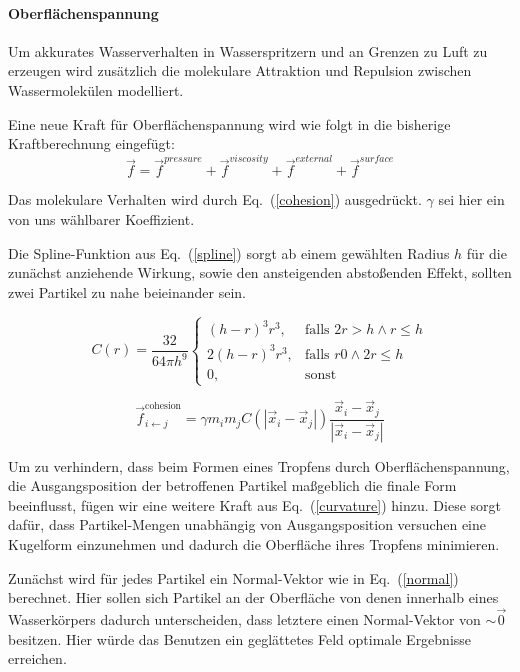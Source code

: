\documentclass[a4paper]{paper}
\renewcommand{\eqref}[1]{Eq.~(\ref{#1})}
\begin{document}
\paragraph{Oberflächenspannung}
Um akkurates Wasserverhalten in Wasserspritzern und an Grenzen zu Luft zu erzeugen wird zusätzlich die molekulare Attraktion und Repulsion zwischen Wassermolekülen modelliert.

Eine neue Kraft für Oberflächenspannung wird wie folgt in die bisherige Kraftberechnung eingefügt:
\begin{equation}
\label{force_with_surface}
\vec{f} = \vec{f}^{pressure} + \vec{f}^{viscosity} + \vec{f}^{external} + \vec{f}^{surface}
\end{equation}


Das molekulare Verhalten wird durch \eqref{cohesion} ausgedrückt. $\gamma$ sei hier ein von uns wählbarer Koeffizient.

Die Spline-Funktion aus \eqref{spline} sorgt ab einem gewählten Radius $h$ für die zunächst anziehende Wirkung, sowie den ansteigenden abstoßenden Effekt, sollten zwei Partikel zu nahe beieinander sein.

\begin{equation}
\label{spline}
C(r) = \frac{32}{64 \pi h^9}
\begin{cases}
(h-r)^3r^3,  &\text{falls }  2r > h \land r \leq h\\
2(h-r)^3r^3, &\text{falls } r  0 \land 2r \leq h\\
0,&\text{sonst}  
\end{cases}
\end{equation}



\begin{equation}
\label{cohesion}
\vec{f}_{i\leftarrow j}^{\text{cohesion}} = \gamma m_{i} m_{j} C(|\vec{x}_i - \vec{x}_j|)\frac{\vec{x}_i - \vec{x}_j}{|\vec{x}_i - \vec{x}_j|}
\end{equation}


Um zu verhindern, dass beim Formen eines Tropfens durch Oberflächenspannung, die Ausgangsposition der betroffenen Partikel maßgeblich die finale Form beeinflusst, fügen wir eine weitere Kraft aus \eqref{curvature} hinzu.
Diese sorgt dafür, dass Partikel-Mengen unabhängig von Ausgangsposition versuchen eine Kugelform einzunehmen und dadurch die Oberfläche ihres Tropfens minimieren.

Zunächst wird für jedes Partikel ein Normal-Vektor wie in \eqref{normal} berechnet. Hier sollen sich Partikel an der Oberfläche von denen innerhalb eines Wasserkörpers dadurch unterscheiden, dass letztere einen Normal-Vektor von $\sim \vec{0}$ besitzen. Hier würde das Benutzen ein geglättetes Feld optimale Ergebnisse erreichen.
\end{document}
